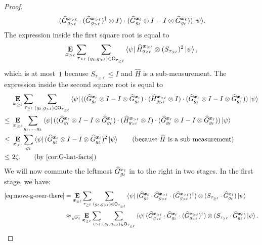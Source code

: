 \begin{proof}
\begin{multline}
{	\cdot (\widehat{G}^{{\boldsymbol{x}}_{> \ell}}_{g_{> \ell}} \cdot(\widehat{G}^{{\boldsymbol{x}}_{> \ell}}_{g_{> \ell}})^\dagger\otimes I)
	\cdot (\widehat{G}^{{\boldsymbol{x}}_{\ell}}_{g_{\ell}} \otimes I - I \otimes\widehat{G}^{{\boldsymbol{x}}_{\ell}}_{g_{\ell}} ))\ket{\psi}}.
\end{multline}
The expression inside the first square root is equal to 
\begin{equation*}
\mathop{\bf E\/}_{{\boldsymbol{x}}_{\geq \ell}} \sum_{\tau_{\geq \ell}}  \sum_{(g_{\ell}, g_{>\ell}) \in \mathsf{O}_{\tau_{\geq \ell}}}
	\bra{\psi} \widehat{H}^{{\boldsymbol{x}}_{\geq \ell}}_{g_{\geq \ell}}
		\otimes (S_{\tau_{\geq \ell}})^2 \ket{\psi},
\end{equation*}
which is at most~$1$ because $S_{\tau_{\geq \ell}} \leq I$ and $\widehat{H}$ is a sub-measurement.
The expression inside the second square root is equal to
\begin{align*}
&\E_{\bx_{\geq \ell}} \sum_{\tau_{\geq \ell}}  \sum_{
	(g_{\ell}, g_{>\ell}) \in \mathsf{O}_{\tau_{\geq \ell}}}
		\bra{\psi} ((\wG^{\bx_{\ell}}_{g_{\ell}} \ot I - I \ot \wG^{\bx_{\ell}}_{g_{\ell}} )
	\cdot (\wH^{\bx_{> \ell}}_{g_{> \ell}} \ot I)
	\cdot (\wG^{\bx_{\ell}}_{g_{\ell}} \ot I - I \ot \wG^{\bx_{\ell}}_{g_{\ell}} ))\ket{\psi}\\
\leq~&\E_{\bx_{\geq \ell}} \sum_{g_{\ell}, \ldots, g_{k}}
		\bra{\psi} ((\wG^{\bx_{\ell}}_{g_{\ell}} \ot I - I \ot \wG^{\bx_{\ell}}_{g_{\ell}} )
	\cdot (\wH^{\bx_{> \ell}}_{g_{> \ell}} \ot I)
	\cdot (\wG^{\bx_{\ell}}_{g_{\ell}} \ot I - I \ot \wG^{\bx_{\ell}}_{g_{\ell}} ))\ket{\psi}\\
\leq~& \E_{\bx_{\geq \ell}} \sum_{g_{\ell}}
		\bra{\psi} (\wG^{\bx_{\ell}}_{g_{\ell}} \ot I - I \ot \wG^{\bx_{\ell}}_{g_{\ell}} )^2\ket{\psi}
			\tag{because $\widehat{H}$ is a sub-measurement}\\
\leq~& 2\zeta. \tag{by \Cref{cor:G-hat-facts}}
\end{align*}
We will now commute the leftmost $\widehat{G}^{x_\ell}_{g_\ell}$ in
 to the right in two stages. In the first stage, we have:
\begin{align}
\eqref{eq:move-g-over-there}
&= \E_{\bx_{\geq \ell}} \sum_{\tau_{\geq \ell}}  \sum_{(g_{\ell}, g_{>\ell}) \in \sfO_{\tau_{\geq \ell}}}
	\bra{\psi} (\wG^{\bx_{\ell}}_{g_{\ell}} \cdot \wG^{\bx_{> \ell}}_{g_{> \ell}} \cdot (\wG^{\bx_{> \ell}}_{g_{> \ell}})^\dagger) \ot (S_{\tau_{\geq \ell}} \cdot \wG^{\bx_{\ell}}_{g_{\ell}})\ket{\psi}\nonumber\\
& \approx_{\sqrt{\nu_4}} \E_{\bx_{\geq \ell}} \sum_{\tau_{\geq \ell}}  \sum_{(g_{\ell}, g_{>\ell}) \in \sfO_{\tau_{\geq \ell}}}
	\bra{\psi} (\wG^{\bx_{> \ell}}_{g_{> \ell}} \cdot \wG^{\bx_{\ell}}_{g_{\ell}} \cdot (\wG^{\bx_{> \ell}}_{g_{> \ell}})^\dagger) \ot (S_{\tau_{\geq \ell}} \cdot \wG^{\bx_{\ell}}_{g_{\ell}})\ket{\psi}.

\end{align}
\end{proof}
